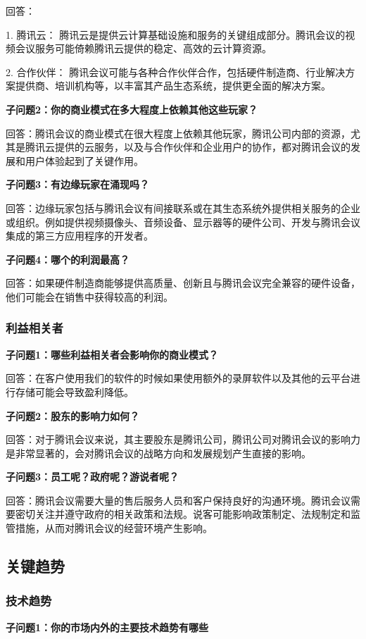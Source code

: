 \documentclass[a4paper,12pt]{article}
\begin{document}
    回答：
    
    1. 腾讯云： 腾讯云是提供云计算基础设施和服务的关键组成部分。腾讯会议的视频会议服务可能倚赖腾讯云提供的稳定、高效的云计算资源。

    2. 合作伙伴： 腾讯会议可能与各种合作伙伴合作，包括硬件制造商、行业解决方案提供商、培训机构等，以丰富其产品生态系统，提供更全面的解决方案。

    \textbf{子问题2：你的商业模式在多大程度上依赖其他这些玩家？}

    回答：腾讯会议的商业模式在很大程度上依赖其他玩家，腾讯公司内部的资源，尤其是腾讯云提供的云服务，以及与合作伙伴和企业用户的协作，都对腾讯会议的发展和用户体验起到了关键作用。

    \textbf{子问题3：有边缘玩家在涌现吗？}

    回答：边缘玩家包括与腾讯会议有间接联系或在其生态系统外提供相关服务的企业或组织。例如提供视频摄像头、音频设备、显示器等的硬件公司、开发与腾讯会议集成的第三方应用程序的开发者。

    \textbf{子问题4：哪个的利润最高？}

    回答：如果硬件制造商能够提供高质量、创新且与腾讯会议完全兼容的硬件设备，他们可能会在销售中获得较高的利润。
    
    \subsubsection{利益相关者}
    \textbf{子问题1：哪些利益相关者会影响你的商业模式？}
    
    回答：在客户使⽤我们的软件的时候如果使⽤额外的录屏软件以及其他的云平台进⾏存储可能会导致盈利降低。

    \textbf{子问题2：股东的影响力如何？}

    回答：对于腾讯会议来说，其主要股东是腾讯公司，腾讯公司对腾讯会议的影响力是非常显著的，会对腾讯会议的战略方向和发展规划产生直接的影响。


    \textbf{子问题3：员工呢？政府呢？游说者呢？}

    回答：腾讯会议需要⼤量的售后服务⼈员和客户保持良好的沟通环境。腾讯会议需要密切关注并遵守政府的相关政策和法规。说客可能影响政策制定、法规制定和监管措施，从而对腾讯会议的经营环境产生影响。
    
    \subsection{关键趋势}
    \subsubsection{技术趋势}
    \textbf{子问题1：你的市场内外的主要技术趋势有哪些}
\end{document}
